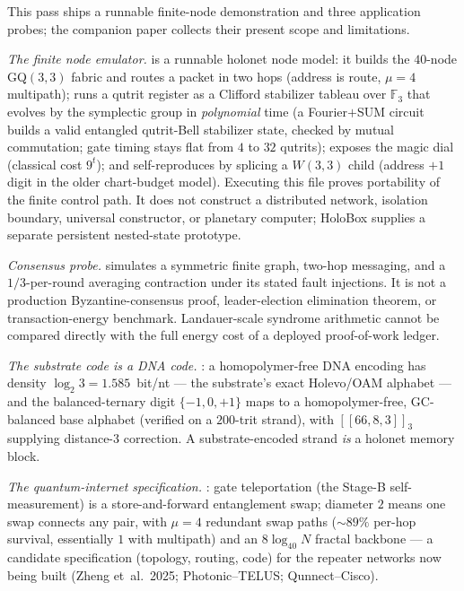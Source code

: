 \documentclass[11pt]{article}
\begin{document}
This pass ships a runnable finite-node demonstration and three application probes; the companion paper
 collects their present scope and limitations.

\emph{The finite node emulator.}  is a runnable holonet node model: it
builds the $40$-node GQ$(3,3)$ fabric and routes a packet in two hops (address is route, $\mu=4$
multipath); runs a qutrit register as a Clifford stabilizer tableau over $\mathbb{F}_3$ that evolves by
the symplectic group in \emph{polynomial} time (a Fourier$+$SUM circuit builds a valid entangled
qutrit-Bell stabilizer state, checked by mutual commutation; gate timing stays flat from $4$ to $32$
qutrits); exposes the magic dial (classical cost $9^t$); and self-reproduces by splicing a $W(3,3)$
child (address $+1$ digit in the older chart-budget model). Executing this file proves portability of
the finite control path. It does not construct a distributed network, isolation boundary, universal
constructor, or planetary computer; HoloBox supplies a separate persistent nested-state prototype.

\emph{Consensus probe.}  simulates a symmetric finite graph,
two-hop messaging, and a $1/3$-per-round averaging contraction under its stated fault injections. It is
not a production Byzantine-consensus proof, leader-election elimination theorem, or transaction-energy
benchmark. Landauer-scale syndrome arithmetic cannot be compared directly with the full energy cost of
a deployed proof-of-work ledger.

\emph{The substrate code is a DNA code.} : a homopolymer-free DNA
encoding has density $\log_2 3 = 1.585$~bit/nt --- the substrate's exact Holevo/OAM alphabet --- and the
balanced-ternary digit $\{-1,0,+1\}$ maps to a homopolymer-free, GC-balanced base alphabet (verified on a
$200$-trit strand), with $[[66,8,3]]_3$ supplying distance-$3$ correction. A substrate-encoded strand
\emph{is} a holonet memory block.

\emph{The quantum-internet specification.} : gate teleportation
(the Stage-B self-measurement) is a store-and-forward entanglement swap; diameter $2$ means one swap
connects any pair, with $\mu=4$ redundant swap paths ($\sim89\%$ per-hop survival, essentially $1$ with
multipath) and an $8\log_{40}N$ fractal backbone --- a candidate specification (topology, routing, code)
for the repeater networks now being built (Zheng et~al.\ 2025; Photonic--TELUS; Qunnect--Cisco).
\end{document}
